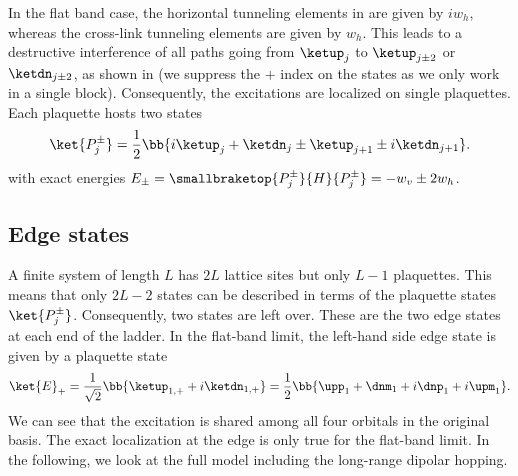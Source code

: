In the flat band case, the horizontal tunneling elements in  are given by $i w_h$, whereas the cross-link tunneling elements are given by $w_h$.
This leads to a destructive interference of all paths going from $\ketup_j$ to $\ketup_{j \pm 2}$ or $\ketdn_{j\pm 2}$, as shown in  (we suppress the $+$ index on the states as we only work in a single block).
Consequently, the excitations are localized on single plaquettes. Each plaquette hosts two states
\begin{align}
    \ket{P_j^\pm} = \frac{1}{2} \bb{ i \ketup_j + \ketdn_j \pm \ketup_{j+1} \pm i \ketdn_{j+1} }.
\end{align}
with exact energies $E_\pm=\smallbraketop{P_j^\pm}{H}{P_j^\pm}=-w_v \pm 2 w_h$.



\subsection{Edge states}
A finite system of length $L$ has $2L$ lattice sites but only $L-1$ plaquettes. This means that only $2L - 2$ states can be described in terms of the plaquette states $\ket{P_j^\pm}$.
Consequently, two states are left over.
These are the two edge states at each end of the ladder. In the flat-band limit, the left-hand side edge state is given by  a plaquette state
\begin{align}
    \ket{E}_+ = \frac{1}{\sqrt{2}} \bb{ \ketup_{1,+} + i \ketdn_{1,+} } = \frac{1}{2} \bb{ \upp_1 + \dnm_1 + i\dnp_1 + i\upm_1 }.
\end{align}
We can see that the excitation is shared among all four orbitals in the original basis.
The exact localization at the edge is only true for the flat-band limit.
In the following, we look at the full model including the long-range dipolar hopping.



